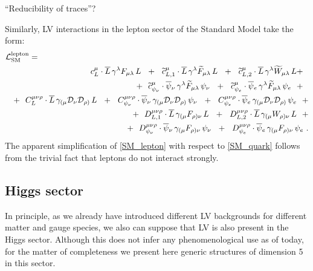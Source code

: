 \documentclass[12pt]{revtex4}
\newcommand{\wt}{\widetilde}
\newcommand{\ov}{\overline}
\newcommand{\md}{\mathcal{D}}
\begin{document}
	``Reducibility of traces''?


	Similarly, LV interactions in the lepton sector of the Standard Model
	take the form:
\begin{eqnarray}
\nonumber
\lefteqn{
	\mathcal{L}_{\rm SM}^{\rm lepton} =
	}
	\\
\nonumber
	&&
	\phantom{+~~}
	c_L^\mu \cdot
	\ov{L}\, \gamma^{\lambda} F_{\mu\lambda}\, L
	~~+~~
	\wt{c}_{L,1}^\mu \cdot
	\ov{L}\, \gamma^{\lambda} \wt{F}_{\mu\lambda}\, L
	~~+~~
	\wt{c}_{L,2}^\mu \cdot
	\ov{L}\, \gamma^{\lambda} \wt{W}_{\mu\lambda}\, L
	+~~
	\\
\nonumber
	&&
	+~~
	\wt{c}_{\psi_\nu}^\mu \cdot
	\ov{\psi}{}_\nu\, \gamma^{\lambda} \wt{F}_{\mu\lambda}\, \psi_\nu
	~~+~~
	\wt{c}_{\psi_e}^\mu \cdot
	\ov{\psi}{}_e\, \gamma^{\lambda} \wt{F}_{\mu\lambda}\, \psi_e
	~~+~~
	\\
\nonumber
	&&
	+~~
	C_L^{\mu\nu\rho} \cdot
	\ov{L}\, \gamma_{(\mu} \md_\nu \md_{\rho)}\, L
	~~+~~
	C_{\psi_\nu}^{\mu\nu\rho} \cdot
	\ov{\psi}{}_\nu\, \gamma_{(\mu} \md_\nu \md_{\rho)}\, \psi_\nu
	~~+~~
	C_{\psi_e}^{\mu\nu\rho} \cdot
	\ov{\psi}{}_e\, \gamma_{(\mu} \md_\nu \md_{\rho)}\, \psi_e
	~~+
	\\
\label{SM_lepton}
	&&
	+~~
	D_{L,1}^{\mu\nu\rho} \cdot
	\ov{L}\, \gamma_{(\mu} F_{\rho)\nu}\, L
	~~+~~
	D_{L,2}^{\mu\nu\rho} \cdot
	\ov{L}\, \gamma_{(\mu} W_{\rho)\nu}\, L
	~~+
	\\
\nonumber
	&&
	+~~
	D_{\psi_\nu}^{\mu\nu\rho} \cdot
	\ov{\psi}{}_\nu\, \gamma_{(\mu} F_{\rho)\nu}\, \psi_\nu
	~~+~~
	D_{\psi_e}^{\mu\nu\rho} \cdot
	\ov{\psi}{}_e\, \gamma_{(\mu} F_{\rho)\nu}\, \psi_e
	~.
\end{eqnarray}
	The apparent simplification of \eqref{SM_lepton} with respect to 
	\eqref{SM_quark} follows from the trivial fact that leptons do not
	interact strongly.

\subsection{Higgs sector}	
	In principle, as we already have introduced different LV backgrounds
	for different matter and gauge species, we also can suppose that 
	LV is also present in the Higgs sector.
	Although this does not infer any phenomenological use as of today,
	for the matter of completeness we present here generic structures
	of dimension 5 in this sector.
\end{document}
